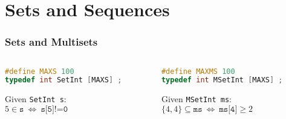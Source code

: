 \documentclass[aspectratio=169]{beamer}
\begin{document}
\section{Sets and Sequences}

\begin{frame}[fragile]\frametitle{Sets and Multisets}
  
\begin{columns}
\begin{column}{.48\textwidth}
\begin{lstlisting}[language=C++,emph={SetInt,MSetInt}]
#define MAXS 100
typedef int SetInt [MAXS] ;
\end{lstlisting}

Given \texttt{SetInt s}:
\\$5 \in \texttt{s} ~\Leftrightarrow~ \texttt{s[5]!=0}$
\end{column}
\begin{column}{.48\textwidth}
\begin{lstlisting}[language=C++,emph={SetInt,MSetInt}]
#define MAXMS 100
typedef int MSetInt [MAXS] ;
\end{lstlisting}

Given \texttt{MSetInt ms}:
\\$\{4,4\} \subseteq \texttt{ms} ~\Leftrightarrow~ \texttt{ms[4]}\geq 2$
\end{column}
\end{columns}

\end{frame}
\end{document}
